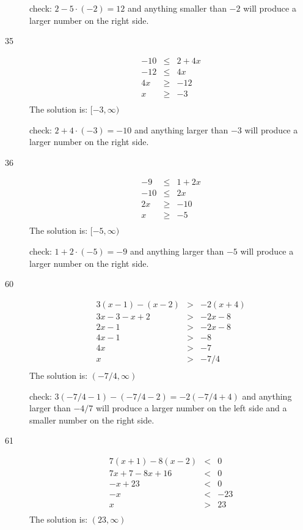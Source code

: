 \documentclass[letterpaper]{exam}
\begin{document}
\begin{description}
      check: \( 2 - 5 \cdot (-2) = 12\) and anything smaller than $-2$ will produce a larger number on the right side.

      \item[35]
      \begin{align*}
        -10 &\leq& 2 + 4x \\
        -12 &\leq& 4x \\
        4x &\geq& -12 \\
        x &\geq& -3 \\
      \end{align*}
      The solution is: \( [-3, \infty) \)

      check: \( 2 + 4 \cdot (-3) = -10\) and anything larger than $-3$ will produce a larger number on the right side.

      \item[36]
      \begin{align*}
        -9 &\leq& 1 + 2x \\
        -10 &\leq& 2x \\
         2x &\geq& -10 \\
         x &\geq& -5 \\
      \end{align*}
      The solution is: \( [-5, \infty) \)

      check: \( 1 + 2 \cdot (-5) = -9\) and anything larger than $-5$ will produce a larger number on the right side.

      \item[60]
      \begin{align*}
        3(x - 1) - (x - 2) &>& -2(x + 4) \\
        3x - 3 - x + 2 &>& -2x - 8 \\
        2x - 1 &>& -2x - 8 \\
        4x - 1 &>& -8 \\
        4x &>& -7 \\
        x &>& -7/4 \\
      \end{align*}
      The solution is: \( (-7/4, \infty) \)

      check: \( 3(-7/4 - 1) - (-7/4 - 2) = -2(-7/4 + 4)  \) and anything larger than $-4/7$ will produce a larger number on
      the left side and a smaller number on the right side.

      \item[61]
      \begin{align*}
        7(x + 1) - 8(x - 2) &<& 0 \\
        7x + 7 - 8x + 16 &<& 0 \\
        -x + 23 &<& 0 \\
        -x &<& -23 \\
        x &>& 23 \\
      \end{align*}
      The solution is: \( (23, \infty) \)


\end{description}
\end{document}
